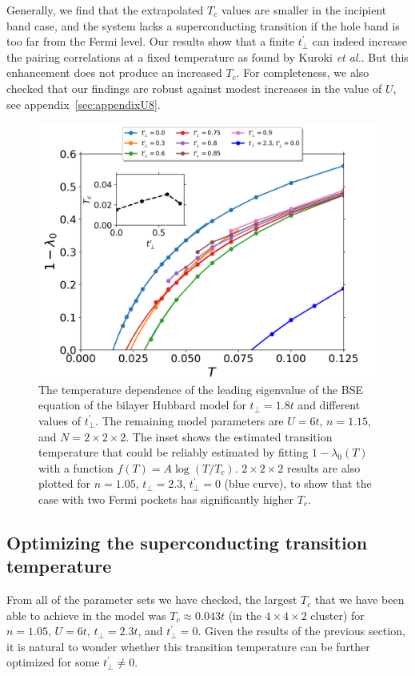 \documentclass[prb,twocolumn,amsmath,amssymb,superscriptaddress,floatfix,nofootinbib]{revtex4-2}
\begin{document}
Generally, we find that the extrapolated $T_c$ values are smaller in the incipient band case, and the system lacks a superconducting transition if the hole band is too far from the Fermi level. Our results show that a finite $t_\perp^{\prime}$ can indeed increase the pairing correlations at a fixed temperature as found by Kuroki \emph{et al.}. But this enhancement does not produce an increased $T_c$. For completeness, we also checked that our findings are robust against modest increases in the value of $U$, see appendix~\ref{sec:appendixU8}.

\begin{figure}
\centering
\includegraphics[scale=0.4]{2x2_L0_n0pt85_U6_varyT.png}
\caption{The temperature dependence of the leading eigenvalue of the BSE equation of the bilayer Hubbard model for  $t_{\perp}=1.8t$ and different values of $t_{\perp}^{\prime}$. The remaining model parameters are $U=6t$, $n=1.15$, and $N = 2\times 2 \times 2$. The inset shows the estimated transition temperature that could be reliably estimated by 
fitting $1-\lambda_0(T)$ with a function $f(T) = A\log(T/T_c)$. $2\times2\times2$ results are also plotted for $n=1.05$, $t_\perp=2.3$, $t_\perp^\prime=0$ (blue curve), to show that the case with two Fermi pockets has significantly higher $T_c$.}
\label{fig:lambdatperpprime2}
\end{figure}

\subsection{Optimizing the superconducting transition temperature} 
From all of the parameter sets we have checked, the largest $T_c$ that we have been able to achieve in the model was $T_c \approx 0.043t$ (in the $4\times 4\times 2$ cluster) for $n=1.05$, $U=6t$, $t_\perp = 2.3t$, and $t_\perp^\prime = 0$. Given the results of the previous section, it is natural to wonder whether this transition temperature can be further optimized for some $t_\perp^\prime \ne 0$. 
\end{document}

